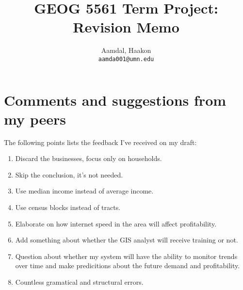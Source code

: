 \documentclass{article}
\title{
    GEOG 5561 Term Project: Revision Memo
}
\author{
    Aamdal, Haakon\\
    \texttt{aamda001@umn.edu}
}
\begin{document}
\maketitle
\section{Comments and suggestions from my peers}
\label{sec:Comments and suggestions from my peers}
The following points lists the feedback I've received on my draft:
\begin{enumerate}
  \item Discard the businesses, focus only on households.
  \item Skip the conclusion, it's not needed.
  \item Use median income instead of average income.
  \item Use census blocks instead of tracts.
  \item Elaborate on how internet speed in the area will affect profitability.
  \item Add something about whether the GIS analyst will receive training or not.
  \item Question about whether my system will have the ability to monitor trends over time and make predicitions about the future demand and profitability.
  \item Countless gramatical and structural errors.
\end{enumerate}
\end{document}
